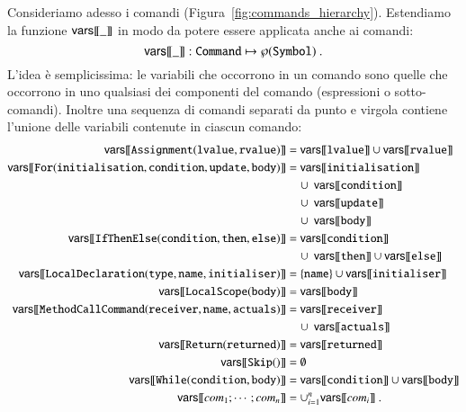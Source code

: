 Consideriamo adesso i comandi (Figura~\ref{fig:commands_hierarchy}).
Estendiamo la funzione ${\mathsf{vars}[\![{\_}]\!]}$ in modo da potere essere applicata anche
ai comandi:
\[
  {\mathsf{vars}[\![{\_}]\!]}:\mathtt{Command}\mapsto\wp(\mathtt{Symbol})~.
\]
%
L'idea \`e semplicissima: le variabili che occorrono in un comando sono
quelle che occorrono in uno qualsiasi dei componenti del comando
(espressioni o sotto-comandi). Inoltre una sequenza di comandi separati
da punto e virgola contiene l'unione delle variabili contenute in ciascun
comando:
%
\begin{align}
  \notag
  \vars{\mathtt{Assignment(lvalue,rvalue)}}
    &=\vars{\mathtt{lvalue}}\cup\vars{\mathtt{rvalue}}\\\notag
  \vars{\mathtt{For(initialisation,condition,update,body)}}
    &=\vars{\mathtt{initialisation}}\\\notag
      &\quad\cup\ \vars{\mathtt{condition}}\\\notag
      &\quad\cup\ \vars{\mathtt{update}}\\\notag
      &\quad\cup\ \vars{\mathtt{body}}\\
  \label{eq:vars_ifthenelse}
  \vars{\mathtt{IfThenElse(condition,then,else)}}
    &=\vars{\mathtt{condition}}\\\notag
      &\quad\cup\ \vars{\mathtt{then}}\cup
      \vars{\mathtt{else}}\\\notag
  \vars{\mathtt{LocalDeclaration(type,name,initialiser)}}
    &=\{\mathtt{name}\}\cup\vars{\mathtt{initialiser}}\\\notag
  \vars{\mathtt{LocalScope(body)}}&=\vars{\mathtt{body}}\\\notag
  \vars{\mathtt{MethodCallCommand(receiver,name,actuals)}}&=
    \vars{\mathtt{receiver}}\\\notag
  &\quad\cup\ \vars{\mathtt{actuals}}\\\notag
  \vars{\mathtt{Return(returned)}}&=\vars{\mathtt{returned}}\\\notag
  \vars{\mathtt{Skip()}}&=\emptyset\\\notag
  \vars{\mathtt{While(condition,body)}}&=\vars{\mathtt{condition}}\cup
    \vars{\mathtt{body}}\\
  \label{eq:vars_sequence}
  \vars{\mathit{com}_1;\cdots;\mathit{com}_n}
    &=\cup_{i=1}^n\vars{\mathit{com}_i}~.
\end{align}

